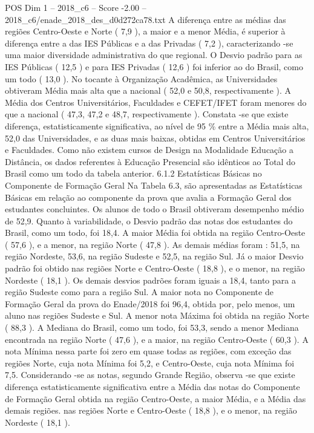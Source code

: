 \begin{textsample}{POS Dim 1 – 2018\_c6 – Score -2.00 – 2018\_c6/enade\_2018\_des\_d0d272ca78.txt}
A diferença entre as médias das regiões Centro-Oeste e Norte ( 7,9 ), a maior e a menor Média, é superior à diferença entre a das IES Públicas e a das Privadas ( 7,2 ), caracterizando -se uma maior diversidade administrativa do que regional.
O Desvio padrão para as IES Públicas ( 12,5 ) e para IES Privadas ( 12,6 ) foi inferior ao do Brasil, como um todo ( 13,0 ).
No tocante à Organização Acadêmica, as Universidades obtiveram Média mais alta que a nacional ( 52,0 e 50,8, respectivamente ).
A Média dos Centros Universitários, Faculdades e CEFET/IFET foram menores do que a nacional ( 47,3, 47,2 e 48,7, respectivamente ).
Constata -se que existe diferença, estatisticamente significativa, ao nível de 95 \% entre a Média mais alta, 52,0 das Universidades, e as duas mais baixas, obtidas em Centros Universitários e Faculdades.
Como não existem cursos de Design na Modalidade Educação a Distância, os dados referentes à Educação Presencial são idênticos ao Total do Brasil como um todo da tabela anterior. 6.1.2 Estatísticas Básicas no Componente de Formação Geral Na Tabela 6.3, são apresentadas as Estatísticas Básicas em relação ao componente da prova que avalia a Formação Geral dos estudantes concluintes.
Os alunos de todo o Brasil obtiveram desempenho médio de 52,9.
Quanto à variabilidade, o Desvio padrão das notas dos estudantes do Brasil, como um todo, foi 18,4.
A maior Média foi obtida na região Centro-Oeste ( 57,6 ), e a menor, na região Norte ( 47,8 ).
As demais médias foram : 51,5, na região Nordeste, 53,6, na região Sudeste e 52,5, na região Sul.
Já o maior Desvio padrão foi obtido nas regiões Norte e Centro-Oeste ( 18,8 ), e o menor, na região Nordeste ( 18,1 ).
Os demais desvios padrões foram iguais a 18,4, tanto para a região Sudeste como para a região Sul.
A maior nota no Componente de Formação Geral da prova do Enade/2018 foi 96,4, obtida por, pelo menos, um aluno nas regiões Sudeste e Sul.
A menor nota Máxima foi obtida na região Norte ( 88,3 ).
A Mediana do Brasil, como um todo, foi 53,3, sendo a menor Mediana encontrada na região Norte ( 47,6 ), e a maior, na região Centro-Oeste ( 60,3 ).
A nota Mínima nessa parte foi zero em quase todas as regiões, com exceção das regiões Norte, cuja nota Mínima foi 5,2, e Centro-Oeste, cuja nota Mínima foi 7,5.
Considerando -se as notas, segundo Grande Região, observa -se que existe diferença estatisticamente significativa entre a Média das notas do Componente de Formação Geral obtida na região Centro-Oeste, a maior Média, e a Média das demais regiões. nas regiões Norte e Centro-Oeste ( 18,8 ), e o menor, na região Nordeste ( 18,1 ).

\end{textsample}
